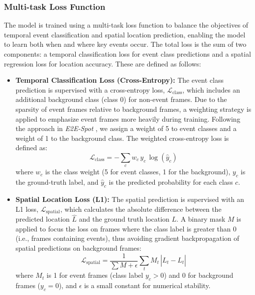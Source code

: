 \documentclass[conference]{IEEEtran}
\begin{document}
\subsubsection{Multi-task Loss Function}

The model is trained using a multi-task loss function to balance the objectives of temporal event classification and spatial location prediction, enabling the model to learn both when and where key events occur. The total loss is the sum of two components: a temporal classification loss for event class predictions and a spatial regression loss for location accuracy. These are defined as follows:

\begin{itemize}
    \item \textbf{Temporal Classification Loss (Cross-Entropy):} The event class prediction is supervised with a cross-entropy loss, \(\mathcal{L}_{\text{class}}\), which includes an additional background class (class 0) for non-event frames. Due to the sparsity of event frames relative to background frames, a weighting strategy is applied to emphasize event frames more heavily during training. Following the approach in \textit{E2E-Spot} \cite{spot22}, we assign a weight of 5 to event classes and a weight of 1 to the background class. The weighted cross-entropy loss is defined as:
    \[
    \mathcal{L}_{\text{class}} = -\sum_{c} w_c \, y_{c} \, \log(\hat{y}_{c})
    \]
    where \(w_c\) is the class weight (5 for event classes, 1 for the background), \(y_c\) is the ground-truth label, and \(\hat{y}_{c}\) is the predicted probability for each class \(c\).

    \item \textbf{Spatial Location Loss (L1):} The spatial prediction is supervised with an L1 loss, \(\mathcal{L}_{\text{spatial}}\), which calculates the absolute difference between the predicted location \(\hat{L}\) and the ground truth location \(L\). A binary mask \(M\) is applied to focus the loss on frames where the class label is greater than 0 (i.e., frames containing events), thus avoiding gradient backpropagation of spatial predictions on background frames:
    \[
    \mathcal{L}_{\text{spatial}} = \frac{1}{\sum M + \epsilon} \sum_{t} M_t \, |\hat{L}_t - L_t|
    \]
    where \(M_t\) is 1 for event frames (class label $y_c > 0$) and 0 for background frames ($y_c = 0$), and \(\epsilon\) is a small constant for numerical stability.

\end{itemize}
\end{document}
